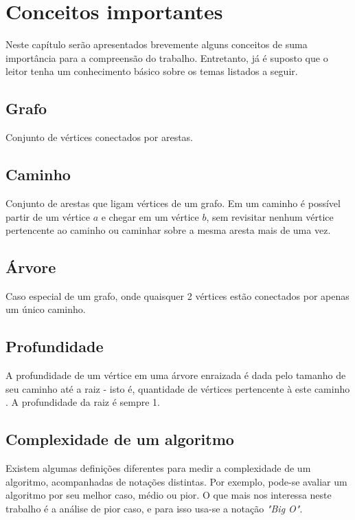 \chapter{Conceitos importantes}
\label{cap:conceitos-importantes}

Neste capítulo serão apresentados brevemente alguns conceitos de suma importância 
para a compreensão do trabalho. Entretanto, já é suposto que o leitor tenha um 
conhecimento básico sobre os temas listados a seguir.

\section{Grafo}

Conjunto de vértices conectados por arestas.

\section{Caminho}

Conjunto de arestas que ligam vértices de um grafo. Em um caminho é possível 
partir de um vértice $a$ e chegar em um vértice $b$, sem revisitar nenhum 
vértice pertencente ao caminho ou caminhar sobre a mesma aresta mais de uma vez.

\section{Árvore}

Caso especial de um grafo, onde quaisquer 2 vértices estão conectados por apenas 
um único caminho.

\section{Profundidade} 

A profundidade de um vértice em uma árvore enraizada é dada pelo tamanho de seu caminho
até a raiz - isto é, quantidade de vértices pertencente à este caminho . A profundidade da raiz é sempre 1.

\section{Complexidade de um algoritmo}

Existem algumas definições diferentes para medir a complexidade de um 
algoritmo, acompanhadas de notações distintas. Por exemplo, pode-se avaliar um 
algoritmo por seu melhor caso, médio ou pior. O que mais nos interessa neste 
trabalho é a análise de pior caso, e para isso usa-se a notação \emph{"Big O"}.


